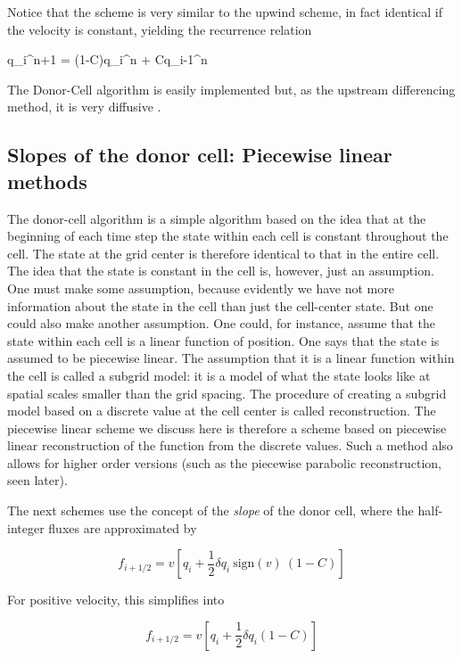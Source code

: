 Notice that the scheme is very similar to the upwind scheme, in fact
identical if the velocity is constant, yielding the recurrence
relation

\beq
q_i^{n+1} = (1-C)q_i^n  + Cq_{i-1}^n
\eeq

The Donor-Cell algorithm is easily implemented
but, as the upstream differencing method, it is very diffusive .

\subsection{Slopes of the donor cell: Piecewise linear methods}

The donor-cell algorithm is a simple algorithm based on the idea that at the beginning of each
time step the state within each cell is constant throughout the cell. The state at the grid
center is therefore identical to that in the entire cell. The idea that the state is constant in the cell
is, however, just an assumption. One must make some assumption, because evidently we have
not more information about the state in the cell than just the cell-center state. But one could
also make another assumption. One could, for instance, assume that the state within each cell
is a linear function of position. One says that the state is assumed to be piecewise linear. The assumption that it is a linear function within the cell is called a subgrid model: it is
a model of what the state looks like at spatial scales smaller than the grid spacing. The procedure
of creating a subgrid model based on a discrete value at the cell
center is called reconstruction. The piecewise linear scheme we discuss here is therefore a scheme based on piecewise linear
reconstruction of the function from the discrete values. Such a method
also allows for higher order versions (such as the piecewise parabolic reconstruction, seen later). 

The next schemes use the concept of the {\it slope} of the donor cell, where the half-integer fluxes are approximated by 

\begin{equation}
f_{i+1/2} = v\left[ q_{i} + \frac{1}{2}\delta q_i \ \mbox{sign}(v) \ (1-C) \right]
\end{equation}


For positive velocity, this simplifies into 

\begin{equation}
f_{i+1/2} = v\left[ q_{i} + \frac{1}{2}\delta q_i (1-C) \right]
\end{equation}

